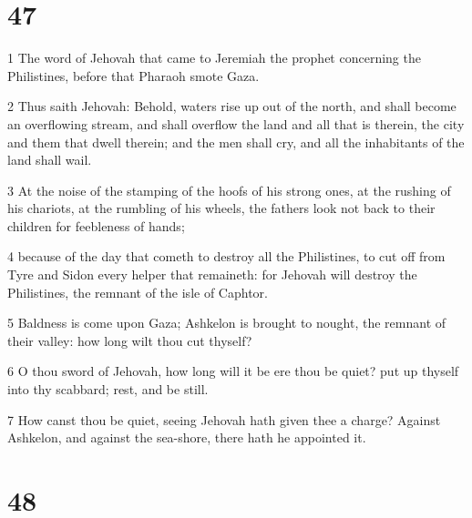 \chapter{47}

\par 1 The word of Jehovah that came to Jeremiah the prophet concerning the Philistines, before that Pharaoh smote Gaza.
\par 2 Thus saith Jehovah: Behold, waters rise up out of the north, and shall become an overflowing stream, and shall overflow the land and all that is therein, the city and them that dwell therein; and the men shall cry, and all the inhabitants of the land shall wail.
\par 3 At the noise of the stamping of the hoofs of his strong ones, at the rushing of his chariots, at the rumbling of his wheels, the fathers look not back to their children for feebleness of hands;
\par 4 because of the day that cometh to destroy all the Philistines, to cut off from Tyre and Sidon every helper that remaineth: for Jehovah will destroy the Philistines, the remnant of the isle of Caphtor.
\par 5 Baldness is come upon Gaza; Ashkelon is brought to nought, the remnant of their valley: how long wilt thou cut thyself?
\par 6 O thou sword of Jehovah, how long will it be ere thou be quiet? put up thyself into thy scabbard; rest, and be still.
\par 7 How canst thou be quiet, seeing Jehovah hath given thee a charge? Against Ashkelon, and against the sea-shore, there hath he appointed it.

\chapter{48}

